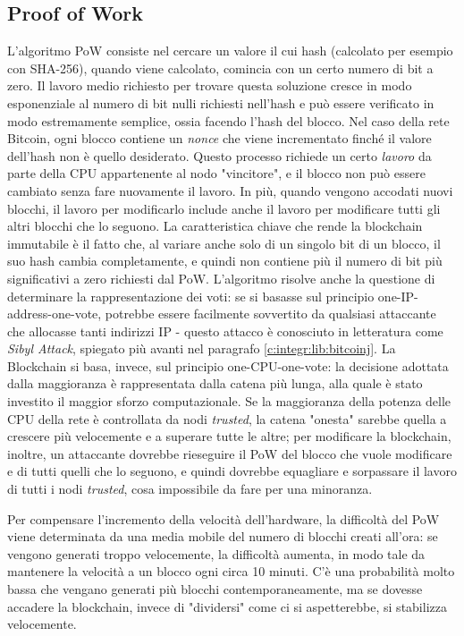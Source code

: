 \subsection{Proof of Work}
\label{c:tec:bitcoin:pow}
L'algoritmo PoW consiste nel cercare un valore il cui hash (calcolato per esempio con SHA-256), quando viene calcolato, comincia con un certo numero di bit a zero. Il lavoro medio richiesto per trovare questa soluzione cresce in modo esponenziale al numero di bit nulli richiesti nell'hash e può essere verificato in modo estremamente semplice, ossia facendo l'hash del blocco.
Nel caso della rete Bitcoin, ogni blocco contiene un \textit{nonce} che viene incrementato finché il valore dell'hash non è quello desiderato. Questo processo richiede un certo \textit{lavoro} da parte della CPU appartenente al nodo "vincitore", e il blocco non può essere cambiato senza fare nuovamente il lavoro. In più, quando vengono accodati nuovi blocchi, il lavoro per modificarlo include anche il lavoro per modificare tutti gli altri blocchi che lo seguono. La caratteristica chiave che rende la blockchain immutabile è il fatto che, al variare anche solo di un singolo bit di un blocco, il suo hash cambia completamente, e quindi non contiene più il numero di bit più significativi a zero richiesti dal PoW. 
L'algoritmo risolve anche la questione di determinare la rappresentazione dei voti: se si basasse sul principio one-IP-address-one-vote, potrebbe essere facilmente sovvertito da qualsiasi attaccante che allocasse tanti indirizzi IP - questo attacco è conosciuto in letteratura come \textit{Sibyl Attack}, spiegato più avanti nel paragrafo \ref{c:integr:lib:bitcoinj}. La Blockchain si basa, invece, sul principio one-CPU-one-vote: la decisione adottata dalla maggioranza è rappresentata dalla catena più lunga, alla quale è stato investito il maggior sforzo computazionale. Se la maggioranza della potenza delle CPU della rete è controllata da nodi \textit{trusted}, la catena "onesta" sarebbe quella a crescere più velocemente e a superare tutte le altre; per modificare la blockchain, inoltre, un attaccante dovrebbe rieseguire il PoW del blocco che vuole modificare e di tutti quelli che lo seguono, e quindi dovrebbe equagliare e sorpassare il lavoro di tutti i nodi \textit{trusted}, cosa impossibile da fare per una minoranza.

Per compensare l'incremento della velocità dell'hardware, la difficoltà del PoW viene determinata da una media mobile del numero di blocchi creati all'ora: se vengono generati troppo velocemente, la difficoltà aumenta, in modo tale da mantenere la velocità a un blocco ogni circa 10 minuti. 
C'è una probabilità molto bassa che vengano generati più blocchi contemporaneamente, ma se dovesse accadere la blockchain, invece di "dividersi" come ci si aspetterebbe, si stabilizza velocemente.

